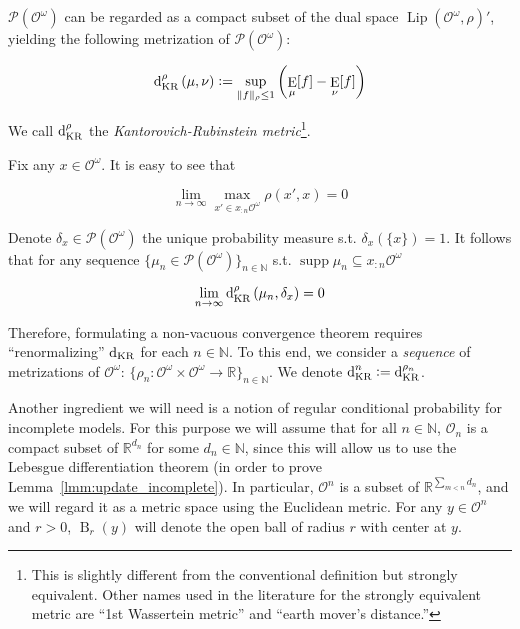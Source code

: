 \documentclass[11pt]{article}
\theoremstyle{definition}
\theoremstyle{plain}
\newcommand{\Nats}{\mathbb{N}}
\newcommand{\Reals}{\mathbb{R}}
\newcommand{\N}[1]{\lVert #1 \rVert}
\newcommand{\Sq}[2]{\{#1\}_{#2 \in \Nats}}
\newcommand{\Sqn}[1]{\Sq{#1}{n}}
\newcommand{\B}{\operatorname{B}}
\DeclareMathOperator{\E}{E}
\newcommand{\PM}{\mathcal{P}}
\newcommand{\Lp}{{\operatorname{Lip}}}
\DeclareMathOperator{\Sp}{supp}
\newcommand{\DKR}{\operatorname{d}_{\textnormal{KR}}}
\newcommand{\Ob}{\mathcal{O}}
\newcommand{\OO}{\Ob^\omega}
\newcommand{\PMO}{\PM(\OO)}
\begin{document}
$\PMO$ can be regarded as a compact subset of the dual space $\Lp\left(\OO,\rho\right)'$, yielding the following metrization of $\PMO$:

\begin{equation}
\DKR^\rho\left(\mu,\nu\right):=\sup_{\N{f}_\rho \leq 1}{\left(\E_\mu[f] - \E_\nu[f]\right)}
\end{equation}

We call $\DKR^\rho$ the \emph{Kantorovich-Rubinstein metric}\footnote{This is slightly different from the conventional definition but strongly equivalent. Other names used in the literature for the strongly equivalent metric are \enquote{1st Wassertein metric} and \enquote{earth mover's distance.}}.

Fix any $x \in \OO$. It is easy to see that

\begin{equation}
\lim_{n \rightarrow \infty} \max_{x' \in x_{:n}\OO} \rho\left(x', x\right) = 0
\end{equation}

Denote $\delta_x \in \PMO$ the unique probability measure s.t. $\delta_x\left(\{x\}\right)=1$. It follows that for any sequence $\Sqn{\mu_n \in \PMO}$ s.t. $\Sp{\mu_n} \subseteq x_{:n}\OO$

\begin{equation}
\lim_{n \rightarrow \infty} \DKR^\rho\left(\mu_n, \delta_x\right) = 0
\end{equation}

Therefore, formulating a non-vacuous convergence theorem requires \enquote{renormalizing} $\DKR$ for each $n \in \Nats$. To this end, we consider a \emph{sequence} of metrizations of $\OO$: $\Sqn{\rho_n: \OO \times \OO \rightarrow \Reals}$. We denote $\DKR^n:=\DKR^{\rho_n}$.

Another ingredient we will need is a notion of regular conditional probability for incomplete models. For this purpose we will assume that for all $n \in \Nats$, $\Ob_n$ is a compact subset of $\Reals^{d_n}$ for some $d_n \in \Nats$, since this will allow us to use the Lebesgue differentiation theorem (in order to prove Lemma~\ref{lmm:update_incomplete}). In particular, $\Ob^n$ is a subset of $\Reals^{\sum_{m < n} d_n}$, and we will regard it as a metric space using the Euclidean metric. For any $y \in \Ob^n$ and $r > 0$, $\B_r\left(y\right)$ will denote the open ball of radius $r$ with center at $y$.
\end{document}
